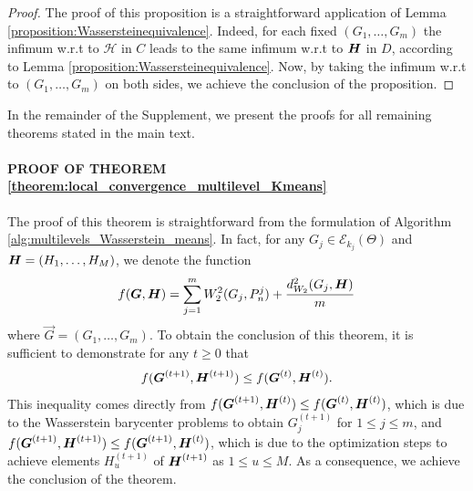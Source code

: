 \begin{proof} The proof of this proposition is a straightforward application of Lemma \ref{proposition:Wassersteinequivalence}. Indeed, for each fixed $(G_{1},\ldots,G_{m})$ the infimum w.r.t to $\mathcal{H}$ in $C$ leads to the same infimum w.r.t to $\boldsymbol{H}$ in $D$, according to Lemma \ref{proposition:Wassersteinequivalence}. Now, by taking the infimum w.r.t to $(G_{1},\ldots,G_{m})$ on both sides, we achieve the conclusion of the proposition.
\end{proof}

In the remainder of the Supplement, we present the proofs for all remaining
theorems stated in the main text.
\paragraph{PROOF OF THEOREM \ref{theorem:local_convergence_multilevel_Kmeans}} %
The proof of this theorem is straightforward from the formulation of Algorithm \ref{alg:multilevels_Wasserstein_means}. %
In fact, for any $G_{j} \in \mathcal{E}_{k_{j}}(\Theta)$ and $\boldsymbol{H} =(H_{1},\ldots,H_{M})$, we denote the function 
\begin{eqnarray}
f(\boldsymbol{G}, \boldsymbol{H})=\mathop {\sum }\limits_{j=1}^{m}{W_{2}^{2}(G_{j},P_{n}^{j})}+\dfrac{d_{W_{2}}^{2}(G_{j},\boldsymbol{H})}{m} \nonumber
\end{eqnarray}
where $\vec{G}=(G_{1},\ldots,G_{m})$. To obtain the conclusion of this theorem, it is sufficient to demonstrate for any $t \geq 0$ that
\begin{eqnarray}
f(\boldsymbol{G}^{(t+1)},\boldsymbol{H}^{(t+1)}) \leq f(\boldsymbol{G}^{(t)},\boldsymbol{H}^{(t)}). \nonumber
\end{eqnarray}
This inequality comes directly from $f(\boldsymbol{G}^{(t+1)},\boldsymbol{H}^{(t)}) \leq f(\boldsymbol{G}^{(t)},\boldsymbol{H}^{(t)})$, which is due to the Wasserstein barycenter problems to obtain $G_{j}^{(t+1)}$ for $1 \leq j \leq m$, and $f(\boldsymbol{G}^{(t+1)},\boldsymbol{H}^{(t+1)}) \leq f(\boldsymbol{G}^{(t+1)},\boldsymbol{H}^{(t)})$, which is due to the optimization steps to achieve elements $H_{u}^{(t+1)}$ of $\boldsymbol{H}^{(t+1)}$ as $1 \leq u \leq M$. As a consequence, we achieve the conclusion of the theorem.
